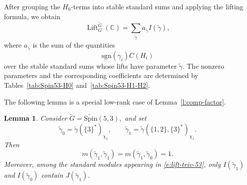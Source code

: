 \documentclass{amsart}
\DeclareMathOperator{\Lift}{Lift}
\newcommand{\LiftC}{\Lift_G^{\tu G}(\bbC)}
\newcommand{\bbC}{{\mathbb{C}}}
\newcommand{\Spin}{{\mathrm{Spin}}}
\newcommand{\sgn}{{\mathrm{sgn}}}
\newtheorem{lemma}[thm]{Lemma}
\theoremstyle{definition}
\newcommand{\tu}{\widetilde}
\begin{document}
After grouping the \(H_0\)-terms into stable standard sums and applying
the lifting formula, we obtain
\begin{equation}\label{e:lift-triv-53}
\LiftC
=
\sum_{\tu\gamma}
a_{\tu\gamma}I(\tu\gamma),
\end{equation}
where \(a_{\tu\gamma}\) is the sum of the quantities
\[
\sgn(\gamma_i)C(H_i)
\]
over the stable standard sums whose lifts have parameter
\(\tu\gamma\). The nonzero parameters and the corresponding coefficients
are determined by Tables~\ref{tab:Spin53-H0}
and~\ref{tab:Spin53-H1-H2}.


The following lemma is a special low-rank case of
Lemma~\ref{l:comp-factor}.

\begin{lemma}\label{l:53-m-coeff}
Consider $\widetilde G=\widetilde{\Spin}(5,3),$
and set
\[
\widetilde\gamma_0
=
\widetilde\gamma(\{3\}^*)_{\chi_1},
\qquad
\widetilde\gamma_1
=
\widetilde\gamma(\{1,2\},\{3\}^*)_{\chi_1}.
\]
Then
\[
m(\widetilde\gamma_1,\widetilde\gamma_1)
=
m(\widetilde\gamma_1,\widetilde\gamma_0)
=
1.
\]
Moreover, among the standard modules appearing in
\eqref{e:lift-triv-53}, only
$I(\widetilde\gamma_1)$ and 
$I(\widetilde\gamma_0)$
contain \(J(\widetilde\gamma_1)\).
\end{lemma}
\end{document}
